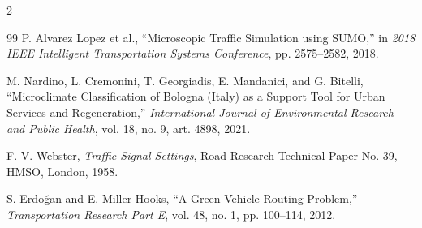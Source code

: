 \documentclass[10pt]{article}
\begin{document}
\begin{multicols}{2}
\begin{thebibliography}{99}
P. Alvarez Lopez et al., ``Microscopic Traffic Simulation using SUMO,'' in
\emph{2018 IEEE Intelligent Transportation Systems Conference},
pp. 2575--2582, 2018.

M. Nardino, L. Cremonini, T. Georgiadis, E. Mandanici, and G. Bitelli,
``Microclimate Classification of Bologna (Italy) as a Support Tool for Urban
Services and Regeneration,'' \emph{International Journal of Environmental
Research and Public Health}, vol. 18, no. 9, art. 4898, 2021.

F. V. Webster, \emph{Traffic Signal Settings}, Road Research Technical Paper
No. 39, HMSO, London, 1958.

S. Erdo\u{g}an and E. Miller-Hooks, ``A Green Vehicle Routing Problem,''
\emph{Transportation Research Part E}, vol. 48, no. 1, pp. 100--114, 2012.

\end{thebibliography}
\end{multicols}
\end{document}
